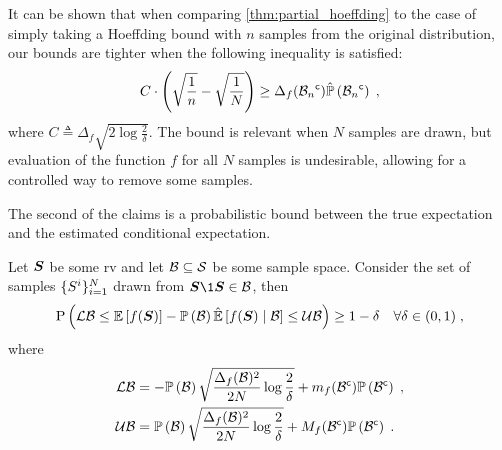 It can be shown that when comparing \cref{thm:partial_hoeffding} to the case of simply taking a Hoeffding bound with $n$ samples from the original distribution, our bounds are tighter when the following inequality is satisfied:
\begin{equation}
	C\cdot\left(\sqrt{\frac{1}{n}}-\sqrt{\frac{1}{N}}\right)\geq\Delta_f({\mathcal B_n}^{\mathsf{c}})\hat{\mathbb{P}}\left({{\mathcal B_n}^{\mathsf{c}}}\right)\;,
\end{equation}
where $C\triangleq \Delta_f\sqrt{2\log\frac{2}{\delta}}$. The bound is relevant when $N$ samples are drawn, but evaluation of the function $f$ for all $N$ samples is undesirable, allowing for a controlled way to remove some samples.

The second of the claims is a probabilistic bound between the true expectation and the estimated conditional expectation.
\begin{theorem}
	\label{thm:conditional_hoeffding}
	Let $\boldsymbol S$ be some \gls{rv} and let $\mathcal B\subseteq\mathcal S$ be some sample space. Consider the set of samples $\{S^i\}_{i=1}^N$ drawn from $\RV\1{\RV\in\subSpace}$, then
	\begin{align*}
		\mathrm{P}\left({\operatorname*{\mathcal{LB}}\leq\operatorname*{\mathbb{E}}\limits_{}\left[{f(\boldsymbol S)}\right]-\mathbb{P}\left({\mathcal B}\right)\operatorname*{\hat{\operatorname*{\mathbb{E}}}}\limits_{}\left[{f(\boldsymbol S)}\mid{\ensuremath{\mathcal B}}\right]\leq\operatorname*{\mathcal{UB}}}\right)\geq1-\delta&&\forall\delta\in(0,1)\;,
	\end{align*}
	where
	\begin{subequations}
		\begin{align}
			\operatorname*{\mathcal{LB}} & =-\mathbb{P}\left({\mathcal B}\right)\sqrt{\frac{\Delta_f(\mathcal B)^2}{2N}\log\frac{2}{\delta}}+m_f({\mathcal B}^{\mathsf{c}})\mathbb{P}\left({{\mathcal B}^{\mathsf{c}}}\right)\;, \\
			\operatorname*{\mathcal{UB}} & =\mathbb{P}\left({\mathcal B}\right)\sqrt{\frac{\Delta_f(\mathcal B)^2}{2N}\log\frac{2}{\delta}}+M_f({\mathcal B}^{\mathsf{c}})\mathbb{P}\left({{\mathcal B}^{\mathsf{c}}}\right)\;.
		\end{align}
	\end{subequations}
\end{theorem}

